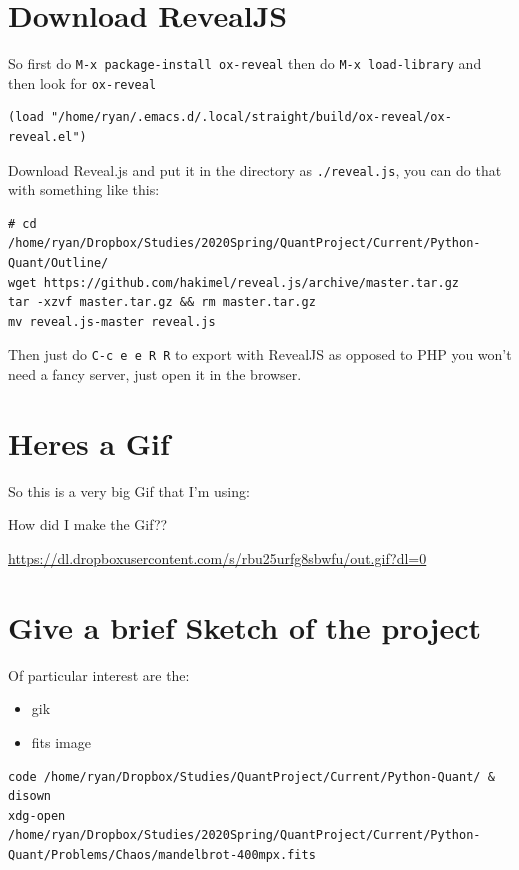 \documentclass[11pt]{article}
\begin{document}
\section{Download RevealJS}
\label{sec:org4659d89}
So first do \texttt{M-x package-install ox-reveal} then do \texttt{M-x load-library} and then look for \texttt{ox-reveal}

\begin{verbatim}
(load "/home/ryan/.emacs.d/.local/straight/build/ox-reveal/ox-reveal.el")
\end{verbatim}

Download Reveal.js and put it in the directory as \texttt{./reveal.js}, you can do that with something like this:

\begin{verbatim}
# cd /home/ryan/Dropbox/Studies/2020Spring/QuantProject/Current/Python-Quant/Outline/
wget https://github.com/hakimel/reveal.js/archive/master.tar.gz
tar -xzvf master.tar.gz && rm master.tar.gz
mv reveal.js-master reveal.js
\end{verbatim}

Then just do \texttt{C-c e e R R} to export with RevealJS as opposed to PHP you won't need a fancy server, just open it in the browser.

\section{Heres a Gif}
\label{sec:org0493fec}
So this is a very big Gif that I'm using:

How did I make the Gif??

\url{https://dl.dropboxusercontent.com/s/rbu25urfg8sbwfu/out.gif?dl=0}

\section{Give a brief Sketch of the project}
\label{sec:orgfb9341b}

Of particular interest are the:
\begin{itemize}
\item gik
\item fits image
\end{itemize}

\begin{verbatim}
code /home/ryan/Dropbox/Studies/QuantProject/Current/Python-Quant/ & disown
xdg-open /home/ryan/Dropbox/Studies/2020Spring/QuantProject/Current/Python-Quant/Problems/Chaos/mandelbrot-400mpx.fits
\end{verbatim}
\end{document}
